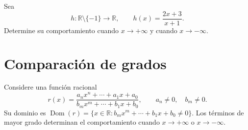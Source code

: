 \documentclass[10pt,a5paper]{article}
\newif\ifmostrarSoluciones
\begin{document}
\begin{ejemplo}
Sea
\[
  h\colon\mathbb{R}\setminus\{-1\}\longrightarrow\mathbb{R},
  \qquad
  h(x)=\frac{2x+3}{x+1}.
\]
Determine su comportamiento cuando $x\to+\infty$ y cuando $x\to-\infty$.
\end{ejemplo}
\ifmostrarSoluciones
\begin{solucion}
Dividimos el numerador y el denominador entre $x$:
\[
  \frac{2x+3}{x+1}
  =\frac{2+3/x}{1+1/x}.
\]
Como
\[
  \lim_{x\to+\infty}\frac{1}{x}
  =\lim_{x\to-\infty}\frac{1}{x}
  =0,
\]
obtenemos
\[
  \lim_{x\to+\infty}\frac{2x+3}{x+1}
  =\lim_{x\to-\infty}\frac{2x+3}{x+1}
  =2.
\]
La recta $y=2$ es una asíntota horizontal.
\end{solucion}
\else\vspace{18mm}\fi

\begin{center}
\end{center}

\section*{Comparación de grados}

Considere una función racional
\[
  r(x)=\frac{a_nx^n+\cdots+a_1x+a_0}
             {b_mx^m+\cdots+b_1x+b_0},
  \qquad
  a_n\neq0,
  \quad
  b_m\neq0.
\]
Su dominio es $\operatorname{Dom}(r)=\{x\in\mathbb{R}:b_mx^m+\cdots+b_1x+b_0\neq0\}$. Los términos de mayor grado determinan el comportamiento cuando $x\to+\infty$ o $x\to-\infty$.
\end{document}
